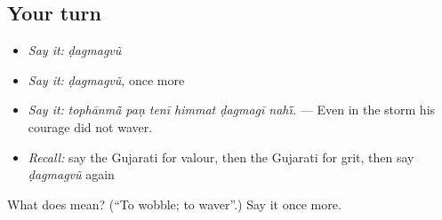 \subsection*{Your turn}
\begin{itemize}
\raggedright
  \item \emph{Say it:} \emph{ḍagmagvũ}
  \item \emph{Say it:} \emph{ḍagmagvũ}, once more
  \item \emph{Say it:} \emph{tophānmā̃ paṇ tenī himmat ḍagmagī nahī̃.} — Even in the storm his courage did not waver.
  \item \emph{Recall:} say the Gujarati for valour, then the Gujarati for grit, then say \emph{ḍagmagvũ} again
\end{itemize}

\begin{tcolorbox}[breakable,colback=teal!4,colframe=teal!35!black,title={Before you move on}]
What does  mean? (\textquotedblleft{}To wobble; to waver\textquotedblright{}.) Say it once more.
\end{tcolorbox}
